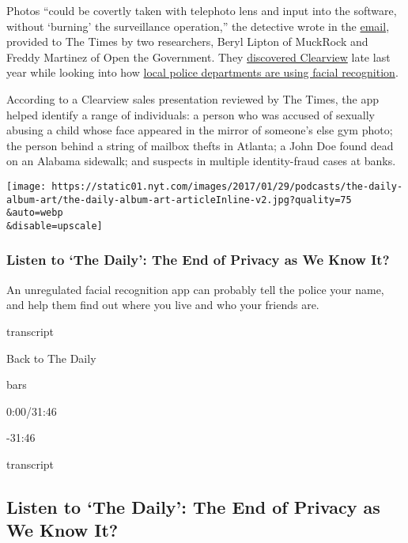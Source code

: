 Photos ``could be covertly taken with telephoto lens and input into the
software, without `burning' the surveillance operation,'' the detective
wrote in the
\href{https://www.muckrock.com/foi/clifton-6861/clifton-nj-83767/}{email},
provided to The Times by two researchers, Beryl Lipton of MuckRock and
Freddy Martinez of Open the Government. They
\href{https://www.muckrock.com/news/archives/2020/jan/18/clearview-ai-facial-recogniton-records/}{discovered
Clearview} late last year while looking into how
\href{https://www.muckrock.com/project/police-surveillance-facial-recognition-use-in-your-backyard-452/}{local
police departments are using facial recognition}.

According to a Clearview sales presentation reviewed by The Times, the
app helped identify a range of individuals: a person who was accused of
sexually abusing a child whose face appeared in the mirror of someone's
else gym photo; the person behind a string of mailbox thefts in Atlanta;
a John Doe found dead on an Alabama sidewalk; and suspects in multiple
identity-fraud cases at banks.

\texttt{[image: https://static01.nyt.com/images/2017/01/29/podcasts/the-daily-album-art/the-daily-album-art-articleInline-v2.jpg?quality=75\\\&auto=webp\\\&disable=upscale]}

\hypertarget{listen-to-the-daily-the-end-of-privacy-as-we-know-it}{%
\subsubsection{Listen to `The Daily': The End of Privacy as We Know
It?}\label{listen-to-the-daily-the-end-of-privacy-as-we-know-it}}

An unregulated facial recognition app can probably tell the police your
name, and help them find out where you live and who your friends are.

transcript

Back to The Daily

bars

0:00/31:46

-31:46

transcript

\hypertarget{listen-to-the-daily-the-end-of-privacy-as-we-know-it-1}{%
\subsection{Listen to `The Daily': The End of Privacy as We Know
It?}\label{listen-to-the-daily-the-end-of-privacy-as-we-know-it-1}}

